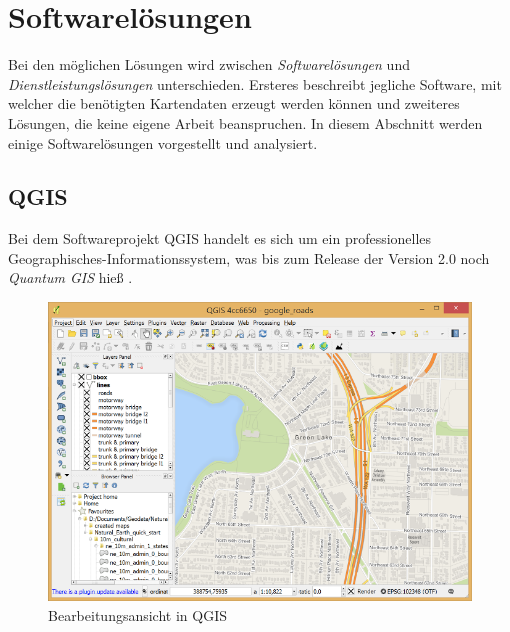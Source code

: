 \section{Softwarelösungen}
Bei den möglichen Lösungen wird zwischen \emph{Softwarelösungen} und \emph{Dienstleistungslösungen} unterschieden.
Ersteres beschreibt jegliche Software, mit welcher die benötigten Kartendaten erzeugt werden können und zweiteres Lösungen, die keine eigene Arbeit beanspruchen.
In diesem Abschnitt werden einige Softwarelösungen vorgestellt und analysiert.

\subsection{QGIS}
Bei dem Softwareprojekt QGIS handelt es sich um ein professionelles Geographisches-Informationssystem, was bis zum Release der Version 2.0 noch \emph{Quantum GIS} hieß \parencite{QGI2013, SUT2013}.
\begin{figure}[h!]
	\centering
	\vspace{15pt}
	\includegraphics[scale=0.5]{images/analysis/qgis.png}
	\caption{Bearbeitungsansicht in QGIS \parencite{QGI}}
	\label{fig:analysis-qgis}
\end{figure}
